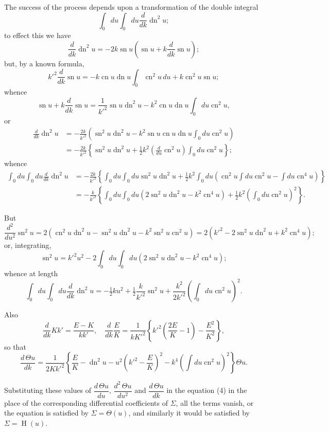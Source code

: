 \documentclass[12pt,a4paper]{article}
\theoremstyle{plain}
\DeclareMathOperator{\sn}{sn}
\DeclareMathOperator{\cn}{cn}
\DeclareMathOperator{\dn}{dn}
\DeclareMathOperator{\Hf}{H}
\begin{document}
The success of the process depends upon a transformation of the double integral
\[
\int_0 du \int_0 du \frac{d}{dk} \dn^2 u;
\]
to effect this we have
\[
\frac{d}{dk} \dn^2 u = -2k \sn u \left(\sn u + k \frac{d}{dk} \sn u\right);
\]
but, by a known formula,
\[
k'^2 \frac{d}{dk} \sn u = -k \cn u \dn u \int_0 \cn^2 u \, du + k \cn^2 u \sn u;
\]
whence
\[
\sn u + k \frac{d}{dk} \sn u = \frac{1}{k'^2} \sn u \dn^2 u - k^2 \cn u \dn u \int_0 du \cn^2 u,
\]
or
\begin{align*}
\frac{d}{dk} \dn^2 u &= -\frac{2k}{k'^2} (\sn^2 u \dn^2 u - k^2 \sn u \cn u \dn u \int_0 du \cn^2 u) \\
&= -\frac{2k}{k'^2} \left\{\sn^2 u \dn^2 u + \tfrac{1}{2}k^2 \left(\frac{d}{du} \cn^2 u\right) \int_0 du \cn^2 u\right\};
\end{align*}
whence
{\small
\begin{align*}
\int_0 du \int_0 du \frac{d}{dk} \dn^2 u &= -\frac{2k}{k'^2} \left\{\int_0 du \int_0 du \sn^2 u \dn^2 u + \tfrac{1}{2}k^2 \int_0 du (\cn^2 u \int du \cn^2 u - \int du \cn^4 u)\right\} \\
&= -\frac{k}{k'^2} \left\{\int_0 du \int_0 du (2 \sn^2 u \dn^2 u - k^2 \cn^4 u) + \tfrac{1}{2}k^2 (\int_0 du \cn^2 u)^2\right\}.
\end{align*}
}

But
\[
\frac{d^2}{du^2} \sn^2 u = 2(\cn^2 u \dn^2 u - \sn^2 u \dn^2 u - k^2 \sn^2 u \cn^2 u) = 2(k'^2 - 2 \sn^2 u \dn^2 u + k^2 \cn^4 u);
\]
or, integrating,
\[
\sn^2 u = k'^2 u^2 - 2 \int_0 du \int_0 du (2 \sn^2 u \dn^2 u - k^2 \cn^4 u);
\]
whence at length
\[
\int_0 du \int_0 du \frac{d}{dk} \dn^2 u = -\tfrac{1}{2} k u^2 + \tfrac{1}{2} \frac{k}{k'^2} \sn^2 u + \frac{k^2}{2k'^2} (\int_0 du \cn^2 u)^2.
\]

Also
\[
\frac{d}{dk} Kk' = \frac{E - K}{kk'}, \quad \frac{d}{dk} \frac{E}{K} = \frac{1}{kK'^2} \left\{k'^2\left(\frac{2E}{K} - 1\right) - \frac{E^2}{K^2}\right\},
\]
so that
\[
\frac{d\, \Theta u}{dk} = \frac{1}{2Kk'^2} \left\{\frac{E}{K} - \dn^2 u - u^2\left(k'^2 - \frac{E}{K}\right)^2 - k^4 (\int du \cn^2 u)^2\right\} \Theta u.
\]


Substituting these values of $\dfrac{d\,\Theta u}{du}$, $\dfrac{d^2\,\Theta u}{du^2}$ and $\dfrac{d\,\Theta u}{dk}$ in the equation (4) in the place of the corresponding differential coefficients of $\Sigma$, all the terms vanish, or the equation is satisfied by $\Sigma = \Theta(u)$, and similarly it would be satisfied by $\Sigma = \Hf(u)$.
\end{document}
